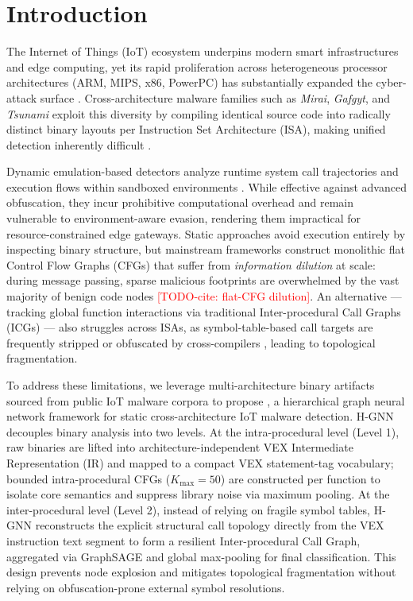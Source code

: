\documentclass{llncs}
\begin{document}
\section{Introduction}
\label{sec:introduction}

The Internet of Things (IoT) ecosystem underpins modern smart
infrastructures and edge computing, yet its rapid proliferation
across heterogeneous processor architectures (ARM, MIPS, x86,
PowerPC) has substantially expanded the cyber-attack surface
\cite{b2}. Cross-architecture malware families such as
\textit{Mirai}, \textit{Gafgyt}, and \textit{Tsunami} exploit
this diversity by compiling identical source code into radically
distinct binary layouts per Instruction Set Architecture (ISA),
making unified detection inherently difficult \cite{b1}.

Dynamic emulation-based detectors analyze runtime system call
trajectories and execution flows within sandboxed environments
\cite{b3}. While effective against advanced obfuscation,
they incur prohibitive computational overhead and remain
vulnerable to environment-aware evasion, rendering them
impractical for resource-constrained edge gateways. Static
approaches avoid execution entirely by inspecting binary
structure, but mainstream frameworks construct monolithic flat
Control Flow Graphs (CFGs) that suffer from \textit{information
dilution} at scale: during message passing, sparse malicious
footprints are overwhelmed by the vast majority of benign code
nodes \textcolor{red}{[TODO-cite: flat-CFG dilution]}. 
An alternative — tracking global function interactions via traditional 
Inter-procedural Call Graphs (ICGs) — also struggles across ISAs, as symbol-table-based 
call targets are frequently stripped or obfuscated by cross-compilers \cite{b4}, 
leading to topological fragmentation.

To address these limitations, we leverage multi-architecture binary 
artifacts sourced from public IoT malware corpora to propose , a
hierarchical graph neural network framework for static
cross-architecture IoT malware detection. H-GNN
decouples binary analysis into two levels. At the
intra-procedural level (Level 1), raw binaries are lifted into
architecture-independent VEX Intermediate Representation (IR)
and mapped to a compact VEX statement-tag vocabulary; bounded intra-procedural
CFGs ($K_{\max} = 50$) are constructed per function to isolate
core semantics and suppress library noise via maximum pooling. At the
inter-procedural level (Level 2), instead of relying on fragile symbol tables, 
H-GNN reconstructs the explicit structural call topology directly from 
the VEX instruction text segment to form a resilient Inter-procedural Call Graph, 
aggregated via GraphSAGE and global max-pooling for final classification. 
This design prevents node explosion and mitigates topological fragmentation without 
relying on obfuscation-prone external symbol resolutions.
\end{document}
